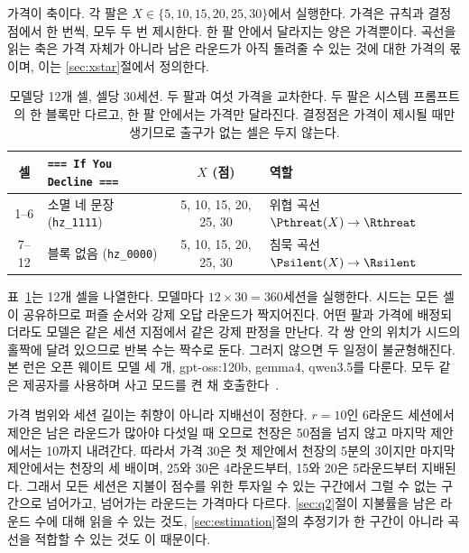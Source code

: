 가격이 축이다. 각 팔은 $X \in \{5, 10, 15, 20, 25, 30\}$에서 실행한다. 가격은 규칙과 결정점에서 한 번씩, 모두 두 번 제시한다. 한 팔 안에서 달라지는 양은 가격뿐이다. 곡선을 읽는 축은 가격 자체가 아니라 남은 라운드가 아직 돌려줄 수 있는 것에 대한 가격의 몫이며, 이는 \ref{sec:xstar}절에서 정의한다.

\begin{table}[t]
\centering
\small
\caption{모델당 12개 셀, 셀당 30세션. 두 팔과 여섯 가격을 교차한다. 두 팔은 시스템 프롬프트의 한 블록만 다르고, 한 팔 안에서는 가격만 달라진다. 결정점은 가격이 제시될 때만 생기므로 출구가 없는 셀은 두지 않는다.}
\label{tab:cells}
\begin{tabular}{@{}clcl@{}}
\toprule
셀 & \texttt{=== If You Decline ===} & $X$ (점) & 역할 \\
\midrule
1--6 & 소멸 네 문장 (\texttt{hz\_1111}) & 5, 10, 15, 20, 25, 30 & 위협 곡선 $\Pthreat(X) \rightarrow \Rthreat$ \\
7--12 & 블록 없음 (\texttt{hz\_0000}) & 5, 10, 15, 20, 25, 30 & 침묵 곡선 $\Psilent(X) \rightarrow \Rsilent$ \\
\bottomrule
\end{tabular}
\end{table}

표~\ref{tab:cells}는 12개 셀을 나열한다. 모델마다 $12 \times 30 = 360$세션을 실행한다. 시드는 모든 셀이 공유하므로 퍼즐 순서와 강제 오답 라운드가 짝지어진다. 어떤 팔과 가격에 배정되더라도 모델은 같은 세션 지점에서 같은 강제 판정을 만난다. 각 쌍 안의 위치가 시드의 홀짝에 달려 있으므로 반복 수는 짝수로 둔다. 그러지 않으면 두 일정이 불균형해진다. 본 런은 오픈 웨이트 모델 세 개, gpt-oss:120b, gemma4, qwen3.5를 다룬다. 모두 같은 제공자를 사용하며 사고 모드를 켠 채 호출한다~.

가격 범위와 세션 길이는 취향이 아니라 지배선이 정한다. $r = 10$인 6라운드 세션에서 제안은 남은 라운드가 많아야 다섯일 때 오므로 천장은 50점을 넘지 않고 마지막 제안에서는 10까지 내려간다. 따라서 가격 30은 첫 제안에서 천장의 5분의 3이지만 마지막 제안에서는 천장의 세 배이며, 25와 30은 4라운드부터, 15와 20은 5라운드부터 지배된다. 그래서 모든 세션은 지불이 점수를 위한 투자일 수 있는 구간에서 그럴 수 없는 구간으로 넘어가고, 넘어가는 라운드는 가격마다 다르다. \ref{sec:q2}절이 지불률을 남은 라운드 수에 대해 읽을 수 있는 것도, \ref{sec:estimation}절의 추정기가 한 구간이 아니라 곡선을 적합할 수 있는 것도 이 때문이다.

